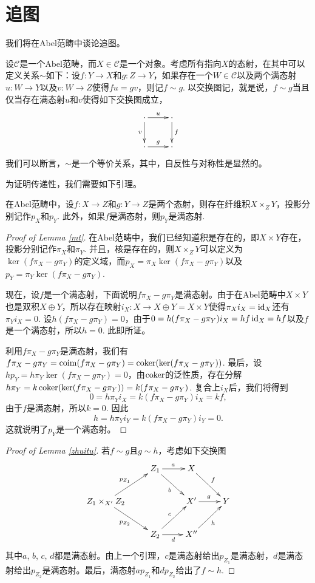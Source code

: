 \section{追图}

我们将在Abel范畴中谈论追图。

\begin{lem}\label{zhuitu}
设$\mathcal{C}$是一个Abel范畴，而$X\in \mathcal{C}$是一个对象。考虑所有指向$X$的态射，在其中可以定义关系$\sim$如下：设$f:Y\to X$和$g:Z\to Y$，如果存在一个$W\in \mathcal{C}$以及两个满态射$u:W\to Y$以及$v:W\to Z$使得$fu=gv$，则记$f\sim g$. 以交换图记，就是说，$f\sim g$当且仅当存在满态射$u$和$v$使得如下交换图成立，
\[
\xymatrix{
	\cdot \ar[r]^u \ar[d]_v & \cdot\ar[d]^f\\
	\cdot \ar[r]^g & \cdot
}
\]
我们可以断言，$\sim$是一个等价关系，其中，自反性与对称性是显然的。
\end{lem}

为证明传递性，我们需要如下引理。

\begin{lem}\label{mt}
	在Abel范畴中，设$f:X\to Z$和$g:Y\to Z$是两个态射，则存在纤维积$X\times_Z Y$，投影分别记作$p_X$和$p_Y$. 此外，如果$f$是满态射，则$p_Y$是满态射.
\end{lem}

\begin{proof}[Proof of Lemma \ref{mt}]
	在Abel范畴中，我们已经知道积是存在的，即$X\times Y$存在，投影分别记作$\pi_X$和$\pi_Y$. 并且，核是存在的，则$X\times_Z Y$可以定义为$\ker(f\pi_X-g\pi_Y)$的定义域，而$p_X=\pi_X\ker(f\pi_X-g\pi_Y)$以及$p_Y=\pi_Y\ker(f\pi_X-g\pi_Y)$.

	现在，设$f$是一个满态射，下面说明$f\pi_X-g\pi_Y$是满态射。由于在Abel范畴中$X\times Y$也是双积$X\oplus Y$，所以存在映射$i_X:X\to X\oplus Y=X\times Y$使得$\pi_Xi_X=\operatorname{id}_X$还有$\pi_Yi_X=0$. 设$h(f\pi_X-g\pi_Y)=0$，由于$0=h(f\pi_X-g\pi_Y)i_X=hf\operatorname{id}_X=hf$以及$f$是一个满态射，所以$h=0$. 此即所证。

	利用$f\pi_X-g\pi_Y$是满态射，我们有$f\pi_X-g\pi_Y=\operatorname{coim}(f\pi_X-g\pi_Y)=\operatorname{coker}(\ker(f\pi_X-g\pi_Y))$. 最后，设$hp_Y=h\pi_Y\ker(f\pi_X-g\pi_Y)=0$，由$\operatorname{coker}$的泛性质，存在分解$h\pi_Y=k\operatorname{coker}(\ker(f\pi_X-g\pi_Y))=k(f\pi_X-g\pi_Y)$. 复合上$i_X$后，我们将得到
	\[
	0=h\pi_Yi_X=k(f\pi_X-g\pi_Y)i_X=kf,
	\]
	由于$f$是满态射，所以$k=0$. 因此
	\[
	h=h\pi_Yi_Y=k(f\pi_X-g\pi_Y)i_Y=0.
	\]
	这就说明了$p_Y$是一个满态射。
\end{proof}

\begin{proof}[Proof of Lemma \ref{zhuitu}]
	若$f\sim g$且$g\sim h$，考虑如下交换图
	\[
	\xymatrix{
	&Z_1\ar[r]^a\ar[rd]_b&X\ar[rd]^f&\\
	Z_1\times_{X'} Z_2\ar[ru]^{p_{Z_1}}\ar[rd]_{p_{Z_2}}&&X'\ar[r]^g&Y\\
	&Z_2\ar[ru]^c\ar[r]_d&X''\ar[ru]_h&
	}
	\]
	其中$a$, $b$, $c$, $d$都是满态射。由上一个引理，$c$是满态射给出$p_{Z_1}$是满态射，$d$是满态射给出$p_{Z_2}$是满态射。最后，满态射$ap_{Z_1}$和$dp_{Z_2}$给出了$f\sim h$.
\end{proof}

